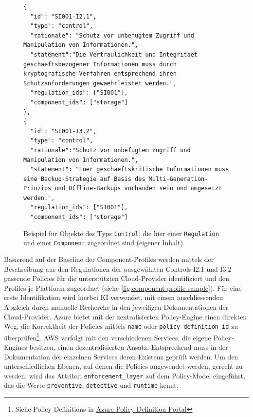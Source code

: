 \begin{figure}[H]
\centering
\begin{lstlisting}
{
  "id": "SI001-I2.1",
  "type": "control",
  "rationale": "Schutz vor unbefugtem Zugriff und Manipulation von Informationen.",
  "statement":"Die Vertraulichkeit und Integritaet geschaeftsbezogener Informationen muss durch kryptografische Verfahren entsprechend ihren Schutzanforderungen gewaehrleistet werden.",
  "regulation_ids": ["SI001"],
  "component_ids": ["storage"]
},
{
  "id": "SI001-I3.2",
  "type": "control",
  "rationale":"Schutz vor unbefugtem Zugriff und Manipulation von Informationen.",
  "statement": "Fuer geschaeftskritische Informationen muss eine Backup-Strategie auf Basis des Multi-Generation-Prinzips und Offline-Backups vorhanden sein und umgesetzt werden.",
  "regulation_ids": ["SI001"],
  "component_ids": ["storage"]

\end{lstlisting}
\caption{Beispiel für Objekte des Typs \texttt{Control}, die hier einer \texttt{Regulation} und einer \texttt{Component} zugeordnet sind (eigener Inhalt)}
\label{fig:control-sample}
\end{figure}

Basierend auf der Baseline der Component-Profiles werden mittels der Beschreibung aus den Regulationen der ausgewählten Controls I2.1 und I3.2 passende Policies für die unterstützten Cloud-Provider identifiziert und den Profiles je Plattform zugeordnet (siehe \autoref{fig:component-profile-sample}). Für eine erste Identifikation wird hierbei KI verwendet, mit einem anschliessenden Abgleich durch manuelle Recherche in den jeweiligen Dokumentationen der Cloud-Provider. Azure bietet mit der zentralisierten Policy-Engine einen direkten Weg, die Korrektheit der Policies mittels \texttt{name} oder \texttt{policy definition id} zu überprüfen\footnote{Siehe Policy Definitions in \href{https://portal.azure.com/\#view/Microsoft_Azure_Policy/PolicyMenuBlade.MenuView/\~/Definitions}{Azure Policy Definition Portal}}. AWS verfolgt mit den verschiedenen Services, die eigene Policy-Engines besitzen, einen dezentralisierten Ansatz. Entsprechend muss in der Dokumentation der einzelnen Services deren Existenz geprüft werden. Um den unterschiedlichen Ebenen, auf denen die Policies angewendet werden, gerecht zu werden, wird das Attribut \texttt{enforcement\_layer} auf dem Policy-Model eingeführt, das die Werte \texttt{preventive}, \texttt{detective} und \texttt{runtime} kennt.


